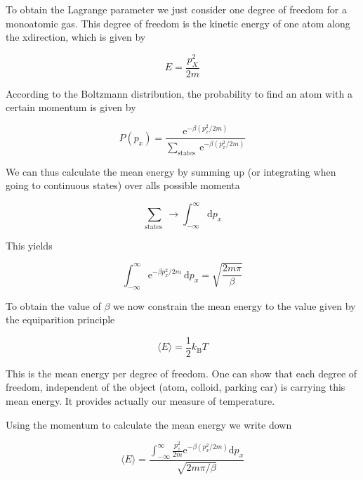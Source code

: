 \documentclass[letterpaper,10pt,english]{sphinxmanual}
\begin{document}
\sphinxAtStartPar
To obtain the Lagrange parameter we just consider one degree of freedom for a monoatomic gas. This degree of freedom is the kinetic energy of one atom along the x\sphinxhyphen{}direction, which is given by

\sphinxAtStartPar
\begin{equation}
E=\frac{p_{X}^{2}}{2 m}
\end{equation}

\sphinxAtStartPar
According to the Boltzmann distribution, the probability to find an atom with a certain momentum is given by

\sphinxAtStartPar
\begin{equation}
P\left(p_{x}\right)=\frac{\mathrm{e}^{-\beta\left(p_{x}^{2} / 2 m\right)}}{\sum_{\text {states }} \mathrm{e}^{-\beta\left(p_{x}^{2} / 2 m\right)}}
\end{equation}

\sphinxAtStartPar
We can thus calculate the mean energy by summing up (or integrating when going to continuous states) over alls possible momenta

\sphinxAtStartPar
\begin{equation}
\sum_{\text {states }} \rightarrow \int_{-\infty}^{\infty} \mathrm{d} p_{x}
\end{equation}

\sphinxAtStartPar
This yields

\sphinxAtStartPar
\begin{equation}
\int_{-\infty}^{\infty} \mathrm{e}^{-\beta p_{x}^{2} / 2 m} \mathrm{~d} p_{x}=\sqrt{\frac{2 m \pi}{\beta}}
\end{equation}

\sphinxAtStartPar
To obtain the value of \(\beta\) we now constrain the mean energy to the value given by the equiparition principle

\sphinxAtStartPar
\begin{equation}
\langle E\rangle=\frac{1}{2} k_{\mathrm{B}} T
\end{equation}

\sphinxAtStartPar
This is the mean energy per degree of freedom. One can show that each degree of freedom, independent of the object (atom, colloid, parking car) is carrying this mean energy. It provides actually our measure of temperature.

\sphinxAtStartPar
Using the momentum to calculate the mean energy we write down

\sphinxAtStartPar
\begin{equation}
\langle E\rangle=\frac{\int_{-\infty}^{\infty} \frac{p_{x}^{2}}{2 m} \mathrm{e}^{-\beta\left(p_{x}^{2} / 2 m\right)} \mathrm{d} p_{x}}{\sqrt{2 m \pi / \beta}}
\end{equation}
\end{document}
